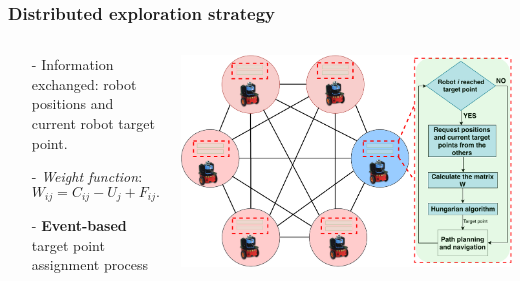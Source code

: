\begin{frame}
	\frametitle{Distributed exploration strategy}
		\begin{columns}
			\begin{column}{0.5\textwidth}
				\begin{itemize}
					\item[-] Information exchanged: robot positions and current robot target point. 
					\item[-]  \textit{Weight function}: 
					\begin{equation}
					{W}_{ij}= {C_{ij}} - {U_{j}} + {F_{ij}}.
					\label{weight}
					\end{equation}
					\item[-] \textbf{Event-based} target point assignment process  
				\end{itemize}
			\end{column}
			\begin{column}{0.5\textwidth}  %
				\begin{center}
					\includegraphics[width=1\textwidth]{figures/struktura_vol3}
					\label{fig:gauss}
				\end{center}
			\end{column}
		\end{columns}	
\end{frame}

